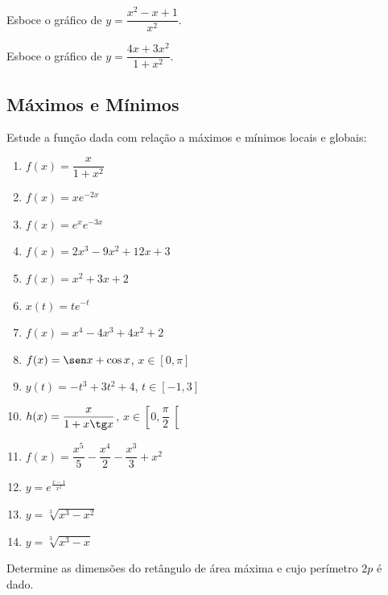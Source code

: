 \begin{exercicio}[19]
Esboce o gráfico de $y = \dfrac{x^2 - x + 1}{x^2}$.
\end{exercicio}

\begin{exercicio}[20]
Esboce o gráfico de $y = \dfrac{4x + 3x^2}{1 + x^2}$.
\end{exercicio}

\clearpage

\subsection{Máximos e Mínimos}

\begin{exercicio}[1]
Estude a função dada com relação a máximos e mínimos locais e globais:
\begin{enumerate}[label=\alph*)]
    \item $f(x) = \dfrac{x}{1 + x^2}$
    \item $f(x) = xe^{-2x}$
    \item $f(x) = e^x e^{-3x}$
    \item $f(x) = 2x^3 - 9x^2 + 12x + 3$
    \item $f(x) = x^2 + 3x + 2$
    \item $x(t) = te^{-t}$
    \item $f(x) = x^4 - 4x^3 + 4x^2 + 2$
    \item $f(x) = \sen x + \cos x$, $x \in [0, \pi]$
    \item $y(t) = -t^3 + 3t^2 + 4$, $t \in [-1, 3]$
    \item $h(x) = \dfrac{x}{1 + x\tg x}$, $x \in \left[0, \dfrac{\pi}{2}\right[$
    \item $f(x) = \dfrac{x^5}{5} - \dfrac{x^4}{2} - \dfrac{x^3}{3} + x^2$
    \item $y = e^{\frac{x-1}{x^2}}$
    \item $y = \sqrt[3]{x^3 - x^2}$
    \item $y = \sqrt[3]{x^3 - x}$
\end{enumerate}
\end{exercicio}

\begin{exercicio}[2]
Determine as dimensões do retângulo de área máxima e cujo perímetro $2p$ é dado.
\end{exercicio}

